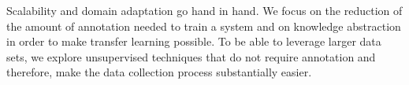 Scalability and domain adaptation go hand in hand.
We focus on the reduction of the amount of annotation needed to train a system and on knowledge abstraction in order to make transfer learning possible.
To be able to leverage larger data sets, we explore unsupervised techniques that do not require annotation and therefore, make the data collection process substantially easier.



